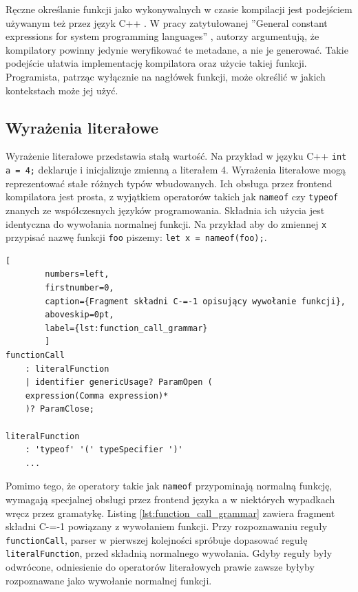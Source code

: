 Ręczne określanie funkcji jako wykonywalnych w czasie kompilacji jest podejściem używanym też przez język C++ \cite{ISO:2012:III}.
W pracy zatytułowanej ''General constant expressions for system programming languages'' \cite{dos2010general_constant_expressions}, autorzy argumentują, że kompilatory powinny jedynie weryfikować te metadane, a nie je generować.
Takie podejście ułatwia implementację kompilatora oraz użycie takiej funkcji.
Programista, patrząc wyłącznie na nagłówek funkcji, może określić w jakich kontekstach może jej użyć.

\begin{minipage}{\textwidth}
	
	
		
\end{minipage}
\subsection{Wyrażenia literałowe}

Wyrażenie literałowe przedstawia stałą wartość.
Na przykład w języku C++ \lstinline{int a = 4;} deklaruje i inicjalizuje zmienną a literałem 4.
Wyrażenia literałowe mogą reprezentować stałe różnych typów wbudowanych.
Ich obsługa przez frontend kompilatora jest prosta, z wyjątkiem operatorów takich jak \lstinline{nameof} czy \lstinline{typeof} znanych ze współczesnych języków programowania.
Składnia ich użycia jest identyczna do wywołania normalnej funkcji.
Na przykład aby do zmiennej \lstinline{x} przypisać nazwę funkcji \lstinline{foo} piszemy: \lstinline{let x = nameof(foo);}.
\begin{minipage}{\linewidth}
	\begin{lstlisting}[
		numbers=left,
		firstnumber=0,
		caption={Fragment składni C-=-1 opisujący wywołanie funkcji},
		aboveskip=0pt,
		label={lst:function_call_grammar}
		]
functionCall
	: literalFunction
	| identifier genericUsage? ParamOpen (
	expression(Comma expression)*
	)? ParamClose;

literalFunction
	: 'typeof' '(' typeSpecifier ')'
	...
	\end{lstlisting}
\end{minipage}

Pomimo tego, że operatory takie jak \lstinline{nameof} przypominają normalną funkcję, wymagają specjalnej obsługi przez frontend języka a w niektórych wypadkach wręcz przez gramatykę.
Listing \ref{lst:function_call_grammar} zawiera fragment składni C-=-1 powiązany z wywołaniem funkcji.
Przy rozpoznawaniu reguły \lstinline{functionCall}, parser w pierwszej kolejności spróbuje dopasować regułę \lstinline{literalFunction}, przed składnią normalnego wywołania.
Gdyby reguły były odwrócone, odniesienie do operatorów literałowych prawie zawsze byłyby rozpoznawane jako wywołanie normalnej funkcji.

